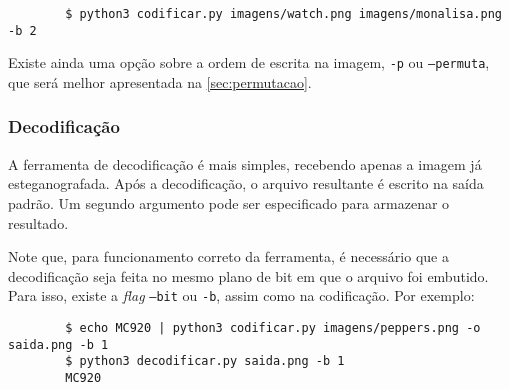     \begin{verbatim}
        $ python3 codificar.py imagens/watch.png imagens/monalisa.png -b 2
    \end{verbatim}

    Existe ainda uma opção sobre a ordem de escrita na imagem, \texttt{-p} ou \texttt{--permuta}, que será melhor apresentada na \cref{sec:permutacao}.

    \subsubsection{Decodificação}

    A ferramenta de decodificação é mais simples, recebendo apenas a imagem já esteganografada. Após a decodificação, o arquivo resultante é escrito na saída padrão. Um segundo argumento pode ser especificado para armazenar o resultado.

    Note que, para funcionamento correto da ferramenta, é necessário que a decodificação seja feita no mesmo plano de bit em que o arquivo foi embutido. Para isso, existe a \textit{flag} \texttt{--bit} ou \texttt{-b}, assim como na codificação. Por exemplo:

    \begin{verbatim}
        $ echo MC920 | python3 codificar.py imagens/peppers.png -o saida.png -b 1
        $ python3 decodificar.py saida.png -b 1
        MC920
    \end{verbatim}
